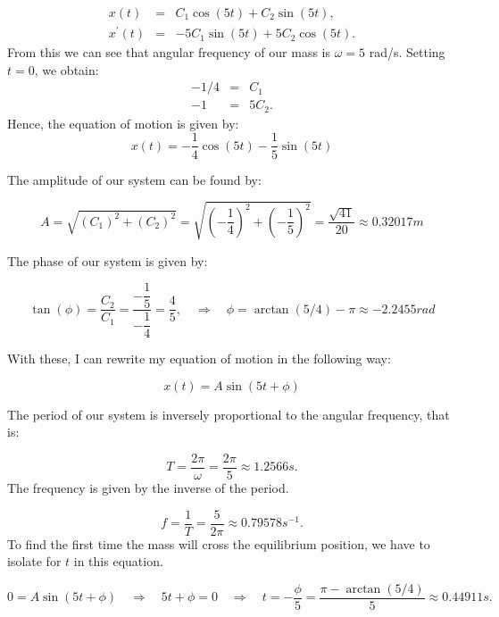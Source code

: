 \documentclass[11pt]{article}
\begin{document}
\begin{solution}
\begin{eqnarray*}
x(t) & = & C_{1} \cos(5 t) + C_{2} \sin(5 t), \\
x^{\prime}(t) & = & - 5 C_{1} \sin(5 t) + 5 C_{2} \cos(5 t).
\end{eqnarray*}
From this we can see that angular frequency of our mass is $\omega = 5$ rad/s.
Setting $ t=0 $, we obtain:
\begin{eqnarray*}
-1/4 & = & C_{1}  \\
-1 & = &  5 C_{2} .
\end{eqnarray*}
Hence, the equation of motion is given by:
\begin{equation*}
x(t) =  -\dfrac{1}{4} \cos(5 t) -\dfrac{1}{5} \sin(5 t)
\end{equation*}

The amplitude of our system can be found by:

\begin{equation*}
A =  \sqrt{\left(C_{1}\right)^2 + \left(C_{2}\right)^2} = \sqrt{\left(-\dfrac{1}{4}\right)^2 + \left(-\dfrac{1}{5}\right)^2} = \dfrac{\sqrt{41}}{20} \approx 0.32017 m
\end{equation*}

The phase of our system is given by:

\begin{equation*}
\tan(\phi) =  \dfrac{C_{2}}{C_{1}} = \dfrac{-\dfrac{1}{5}}{-\dfrac{1}{4}} = \dfrac{4}{5}, \quad \Rightarrow \quad \phi = \arctan(5/4) - \pi \approx -2.2455 rad
\end{equation*}

With these, I can rewrite my equation of motion in the following way:

\begin{equation*}
x(t) =  A \sin ( 5t + \phi)
\end{equation*}

The period of our system is inversely proportional to the angular frequency, that is:

\begin{equation*}
T =  \dfrac{2\pi}{\omega} = \dfrac{2\pi}{5} \approx 1.2566s.
\end{equation*}
The frequency is given by the inverse of the period.

\begin{equation*}
f =  \dfrac{1}{T} = \dfrac{5}{2\pi} \approx 0.79578s^{-1}.
\end{equation*}
To find the first time the mass will cross the equilibrium position,  we have to isolate for $t$ in this equation.

\begin{equation*}
0 =  A \sin ( 5t + \phi) \quad \Rightarrow \quad 5t + \phi =0 \quad \Rightarrow \quad t  = -\dfrac{\phi}{5} = \dfrac{\pi - \arctan(5/4)}{5} \approx 0.44911s.
\end{equation*}
\end{solution}
\end{document}
